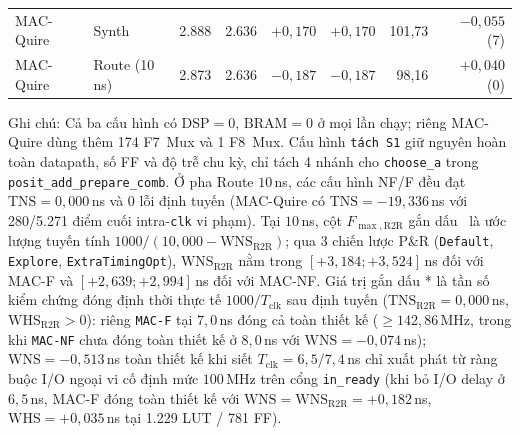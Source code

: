 \begin{table}[!htbp]
\begin{tabularx}{\textwidth}{@{}Y l r r r r r r@{}}
    \midrule
    MAC-Quire & Synth & 2.888 & 2.636 & $+0{,}170$ & $+0{,}170$ & 101,73 & $-0{,}055$ (7) \\
    MAC-Quire & Route (10\,ns) & 2.873 & 2.636 & $-0{,}187$ & $-0{,}187$ & 98,16 & $+0{,}040$ (0) \\
    \bottomrule
  \end{tabularx}
  \vspace{2pt}
  {\footnotesize Ghi chú: Cả ba cấu hình có $\mathrm{DSP}=0$, $\mathrm{BRAM}=0$ ở mọi lần chạy; riêng MAC-Quire dùng thêm 174 F7~Mux và 1 F8~Mux. Cấu hình \texttt{tách S1} giữ nguyên hoàn toàn datapath, số FF và độ trễ chu kỳ, chỉ tách 4 nhánh cho \texttt{choose\_a} trong \texttt{posit\_add\_prepare\_comb}. Ở pha Route $10$\,ns, các cấu hình NF/F đều đạt $\mathrm{TNS}=0{,}000$\,ns và 0 lỗi định tuyến (MAC-Quire có $\mathrm{TNS}=-19{,}336$\,ns với 280/5.271 điểm cuối intra-\texttt{clk} vi phạm). Tại $10$\,ns, cột $F_{\max,\mathrm{R2R}}$ gắn dấu \dag\ là ước lượng tuyến tính $1000/(10{,}000-\mathrm{WNS}_{\mathrm{R2R}})$; qua 3 chiến lược P\&R (\texttt{Default}, \texttt{Explore}, \texttt{ExtraTimingOpt}), $\mathrm{WNS}_{\mathrm{R2R}}$ nằm trong $[+3{,}184; +3{,}524]$\,ns đối với MAC-F và $[+2{,}639; +2{,}994]$\,ns đối với MAC-NF. Giá trị gắn dấu * là tần số kiểm chứng đóng định thời thực tế $1000/T_{\mathrm{clk}}$ sau định tuyến ($\mathrm{TNS}_{\mathrm{R2R}}=0{,}000$\,ns, $\mathrm{WHS}_{\mathrm{R2R}}>0$): riêng \texttt{MAC-F} tại $7{,}0$\,ns đóng cả toàn thiết kế ($\ge 142{,}86$\,MHz, trong khi \texttt{MAC-NF} chưa đóng toàn thiết kế ở $8{,}0$\,ns với $\mathrm{WNS}=-0{,}074$\,ns); $\mathrm{WNS}=-0{,}513$\,ns toàn thiết kế khi siết $T_{\mathrm{clk}}=6{,}5$/$7{,}4$\,ns chỉ xuất phát từ ràng buộc I/O ngoại vi cố định mức $100$\,MHz trên cổng \texttt{in\_ready} (khi bỏ I/O delay ở $6{,}5$\,ns, MAC-F đóng toàn thiết kế với $\mathrm{WNS}=\mathrm{WNS}_{\mathrm{R2R}}=+0{,}182$\,ns, $\mathrm{WHS}=+0{,}035$\,ns tại 1.229 LUT / 781 FF).}
\end{table}
